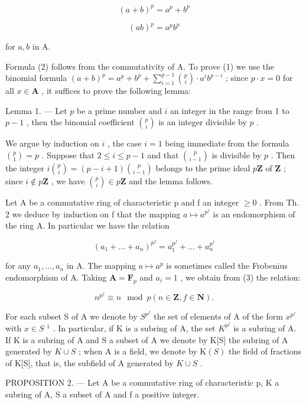 \[
(a + b) ^ {p} = a ^ {p} + b ^ {p}\tag{1}
\]

\[
(a b) ^ {p} = a ^ {p} b ^ {p}\tag{2}
\]

for \(a, b\) in A.

Formula (2) follows from the commutativity of A. To prove (1) we use the binomial formula \((a + b)^p = a^p + b^p + \sum_{i=1}^{p-1} \binom{p}{i} \cdot a^ib^{p-i}\) ; since \(p \cdot x = 0\) for all \(x \in \mathbf{A}\) , it suffices to prove the following lemma:

Lemma 1. --- Let \(p\) be a prime number and \(i\) an integer in the range from 1 to \(p - 1\) , then the binomial coefficient \(\binom{p}{i}\) is an integer divisible by \(p\) .

We argue by induction on \(i\) , the case \(i = 1\) being immediate from the formula \(\binom{p}{1} = p\) . Suppose that \(2 \leqslant i \leqslant p - 1\) and that \(\binom{p}{i - 1}\) is divisible by \(p\) . Then the integer \(i\binom{p}{i} = (p - i + 1)\binom{p}{i - 1}\) belongs to the prime ideal \(p\mathbf{Z}\) of \(\mathbf{Z}\) ; since \(i \notin p\mathbf{Z}\) , we have \(\binom{p}{i} \in p\mathbf{Z}\) and the lemma follows.

Let A be a commutative ring of characteristic p and f an integer \(\geqslant0\) . From Th. 2 we deduce by induction on f that the mapping \(a\mapsto a^{p^{f}}\) is an endomorphism of the ring A. In particular we have the relation

\[
(a _ {1} + \dots + a _ {n}) ^ {p ^ {f}} = a _ {1} ^ {p ^ {f}} + \dots + a _ {n} ^ {p ^ {f}}\tag{3}
\]

for any \(a_{1},\ldots,a_{n}\) in A. The mapping \(a\mapsto a^{p}\) is sometimes called the Frobenius endomorphism of A. Taking \(\mathbf{A}=\mathbf{F}_{p}\) and \(a_{i}=1\) , we obtain from (3) the relation:

\[
n ^ {p ^ {f}} \equiv n \mod p (n \in \mathbf {Z}, f \in \mathbf {N}).\tag{4}
\]

For each subset S of A we denote by \(S^{p^{f}}\) the set of elements of A of the form \(x^{p^{f}}\) with \(x \in S\) \(^{1}\) . In particular, if K is a subring of A, the set \(K^{p^{f}}\) is a subring of A. If K is a subring of A and S a subset of A we denote by K{[}S{]} the subring of A generated by \(K \cup S\) ; when A is a field, we denote by \(\mathrm{K}(S)\) the field of fractions of K{[}S{]}, that is, the subfield of A generated by \(K \cup S\) .

PROPOSITION 2. --- Let A be a commutative ring of characteristic p, K a subring of A, S a subset of A and f a positive integer.

